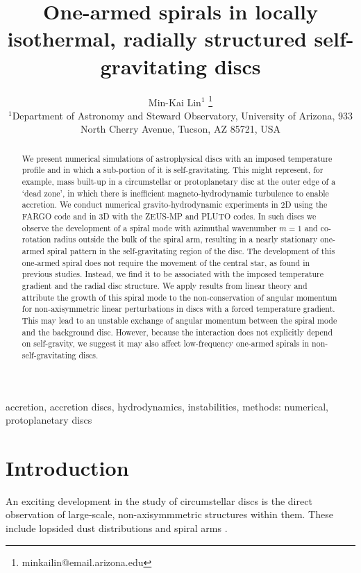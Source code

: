 \documentclass[useAMS,usenatbib]{mn2e}
\title[One-armed spirals]{One-armed spirals in 
  locally isothermal, radially structured self-gravitating discs}
\author[Lin]{Min-Kai Lin$^{1}$
  \thanks{ minkailin@email.arizona.edu} \\ 
  $^1$Department of Astronomy and Steward Observatory, University of
  Arizona, 933 North Cherry Avenue, Tucson, AZ 85721, USA 
}
\begin{document}
\maketitle
\begin{abstract} 
  We present numerical simulations of astrophysical discs with an 
  imposed temperature profile and in which a sub-portion of it is
  self-gravitating. This might represent, for example, mass  
  built-up in a circumstellar or protoplanetary
  disc at the outer edge of a `dead zone', in which there
  is inefficient magneto-hydrodynamic turbulence to enable accretion. 
  We conduct numerical gravito-hydrodynamic experiments in 2D using
  the FARGO code and in 3D with the ZEUS-MP and PLUTO codes. In such
  discs we observe the development of a 
  spiral mode with azimuthal wavenumber $m=1$ and co-rotation radius 
  outside the bulk of the spiral arm, resulting in a nearly stationary 
  one-armed spiral pattern in the self-gravitating region of the
  disc. The development of this one-armed 
  spiral does not require the movement of  
  the central star, as found in previous studies. Instead, we find it
  to be associated with the imposed 
  temperature gradient and the radial disc structure. 
  We apply results from linear theory and attribute the
  growth of this spiral mode to the non-conservation of angular momentum
  for non-axisymmetric linear perturbations in discs with a forced temperature
  gradient. This may lead to an unstable exchange of angular momentum
  between the spiral mode 
  and the background disc. However, because the interaction does
  not explicitly depend on self-gravity, we suggest it may also
  affect low-frequency one-armed spirals in non-self-gravitating
  discs. 
\end{abstract}

\begin{keywords}
  accretion, accretion discs, hydrodynamics, instabilities, methods: numerical, protoplanetary discs 
\end{keywords}

\section{Introduction}\label{intro}
An exciting development in the study of circumstellar 
discs is the direct observation of large-scale, non-axisymmmetric
structures within them. These
include lopsided dust distributions 
\citep{marel13,fukagawa13,casassus13,isella13,perez14,follette14} and
spiral arms 
\citep{hashimoto11,muto12,boccaletti14,grady13,christiaens14,avenhaus14}. 
\end{document}
